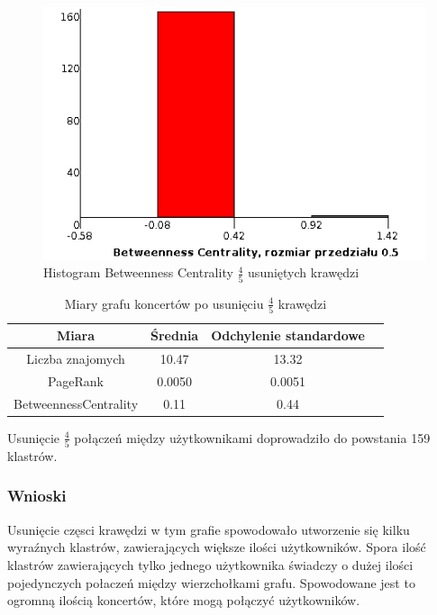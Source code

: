 \documentclass[10pt,a4paper]{article}
\begin{document}
\begin{figure}[H]
\centering
\caption{Histogram Betweenness Centrality $\frac{4}{5}$ usuniętych krawędzi}
\includegraphics[scale=0.6]{wyniki/final200Events/4200eventsBCHist.png}
\end{figure}


\begin{table}[H]
  \caption{Miary grafu koncertów po usunięciu $\frac{4}{5}$ krawędzi}
  \centering
    \begin{tabular}{cccc}
    \addlinespace
    \toprule
    Miara & Średnia  & Odchylenie standardowe \\
    \midrule
    Liczba znajomych & 10.47 & 13.32 \\
    PageRank & 0.0050 & 0.0051 \\
    BetweennessCentrality & 0.11 & 0.44\\ 
    \bottomrule
    \end{tabular}
  \label{tab:addlabel}
\end{table}

Usunięcie $\frac{4}{5}$ połączeń między użytkownikami doprowadziło do powstania 159 klastrów. 

\subsubsection {Wnioski}
  Usunięcie częsci krawędzi w tym grafie spowodowało utworzenie się kilku wyraźnych klastrów, zawierających większe ilości użytkowników.
Spora ilość klastrów zawierających tylko jednego użytkownika świadczy o dużej ilości pojedynczych połaczeń między wierzchołkami grafu.
Spowodowane jest to ogromną ilością koncertów, które mogą połączyć użytkowników. 
\end{document}
